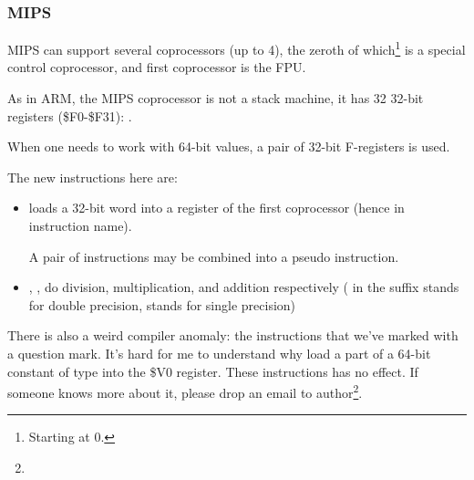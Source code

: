 \subsubsection{MIPS}

MIPS can support several coprocessors (up to 4), 
the zeroth of which\footnote{Starting at 0.} is a special control coprocessor,
and first coprocessor is the FPU.

As in ARM, the MIPS coprocessor is not a stack machine, it has 32 32-bit registers (\$F0-\$F31):
.

When one needs to work with 64-bit \Tdouble values, a pair of 32-bit F-registers is used.



The new instructions here are:

\begin{itemize}

\item {} loads a 32-bit word into a register of the first coprocessor (hence  in instruction name).

A pair of  instructions may be combined into a  pseudo instruction.

\item {}, ,  do division, multiplication, and addition respectively 
( in the suffix stands for double precision,  stands for single precision)

\end{itemize}

\myindex{\CompilerAnomaly}
\label{MIPS_FPU_LUI}

There is also a weird compiler anomaly: the  instructions that we've marked with a question mark.
It's hard for me to understand why load a part of a 64-bit constant of \Tdouble type into the \$V0 register.
These instructions has no effect.
If someone knows more about it, please drop an email to author\footnote{\EMAILS}.

